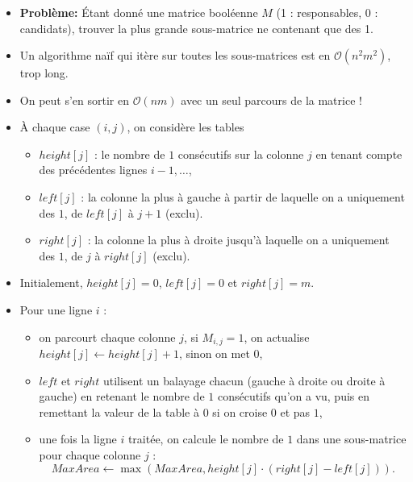 \begin{frame}
    \frametitle{\problemtitle}
    \begin{itemize}
        \item<+-> \textbf{Problème:} Étant donné une matrice booléenne $M$ (1 : responsables, 0 : candidats), trouver la plus grande sous-matrice ne contenant que des 1.
        \item<+-> Un algorithme naïf qui itère sur toutes les sous-matrices est en $\mathcal{O}(n^2m^2)$, trop long.
        \item<+-> On peut s'en sortir en $\mathcal{O}(nm)$ avec un seul parcours de la matrice !
        \item<+-> À chaque case $(i,j)$, on considère les tables
                  \begin{itemize}
                     \item $height[j]$ : le nombre de $1$ consécutifs sur la colonne $j$ en tenant compte des précédentes lignes $i-1,\dots$,
                     \item $left[j]$ : la colonne la plus à gauche à partir de laquelle on a uniquement des $1$, de $left[j]$ à $j+1$ (exclu).
                     \item $right[j]$ : la colonne la plus à droite jusqu'à laquelle on a uniquement des $1$, de $j$ à $right[j]$ (exclu).
                  \end{itemize}
        \item<+-> Initialement, $height[j]=0$, $left[j]=0$ et $right[j]=m$.
        \item<+-> Pour une ligne $i$ :
          \begin{itemize}
             \item on parcourt chaque colonne $j$, si $M_{i,j}=1$, on actualise $height[j]\leftarrow height[j]+1$, sinon on met $0$,
             \item $left$ et $right$ utilisent un balayage chacun (gauche à droite ou droite à gauche) en retenant le nombre de $1$ consécutifs qu'on a vu, puis en remettant la valeur de la table à $0$ si on croise $0$ et pas $1$,
             \item<+-> une fois la ligne $i$ traitée, on calcule le nombre de $1$ dans une sous-matrice pour chaque colonne $j$ : \[MaxArea \leftarrow \max(MaxArea, height[j]\cdot (right[j]-left[j])).\]
          \end{itemize}
    \end{itemize}
\end{frame}


